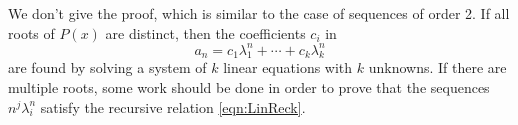 We don't give the proof, which is similar to the case of sequences of order 2.
If all roots of $P(x)$ are distinct, then the coefficients $c_i$ in
\[
a_n = c_1 \lambda_1^n + \cdots + c_k \lambda_k^n
\]
are found by solving a system of $k$ linear equations with $k$ unknowns.
If there are multiple roots, some work should be done in order to prove that the sequences $n^j \lambda_i^n$ satisfy
the recursive relation \eqref{eqn:LinReck}.

